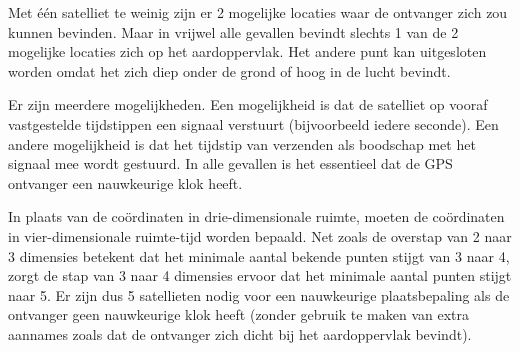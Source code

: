 \begin{Antwoord}{4.11}
		Met \'e\'en satelliet te weinig zijn er 2 mogelijke locaties waar de ontvanger zich zou kunnen bevinden. Maar in vrijwel alle gevallen bevindt slechts 1 van de 2 mogelijke locaties zich op het aardoppervlak. Het andere punt kan uitgesloten worden omdat het zich diep onder de grond of hoog in de lucht bevindt.
	
\end{Antwoord}
\begin{Antwoord}{4.13}
		Er zijn meerdere mogelijkheden. Een mogelijkheid is dat de satelliet op vooraf vastgestelde tijdstippen een signaal verstuurt (bijvoorbeeld iedere seconde). Een andere mogelijkheid is dat het tijdstip van verzenden als boodschap met het signaal mee wordt gestuurd. In alle gevallen is het essentieel dat de GPS ontvanger een nauwkeurige klok heeft.
	
\end{Antwoord}
\begin{Antwoord}{4.15}
		In plaats van de co\"ordinaten in drie-dimensionale ruimte, moeten de co\"ordinaten in vier-dimensionale ruimte-tijd worden bepaald. Net zoals de overstap van 2 naar 3 dimensies betekent dat het minimale aantal bekende punten stijgt van 3 naar 4, zorgt de stap van 3 naar 4 dimensies ervoor dat het minimale aantal punten stijgt naar 5. Er zijn dus 5 satellieten nodig voor een nauwkeurige plaatsbepaling als de ontvanger geen nauwkeurige klok heeft (zonder gebruik te maken van extra aannames zoals dat de ontvanger zich dicht bij het aardoppervlak bevindt).
	
\end{Antwoord}
